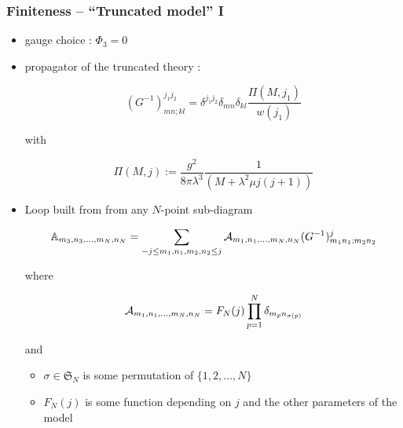 \documentclass[9pt]{beamer}
\begin{document}
\begin{frame}

\frametitle{Finiteness -- ``Truncated model'' I}

\begin{itemize}
\item gauge choice : $\Phi_3 = 0$

\item propagator of the truncated theory : 

\begin{equation*}
(G^{-1})^{j_1j_2}_{mn;kl}=\delta^{j_1j_2}\delta_{mn}\delta_{kl}\frac{\Pi(M,j_1)}{w(j_1)}
\end{equation*}

with

\vspace*{-5pt}
\begin{equation*}
\Pi(M,j) := \frac{g^2}{8\pi\lambda^3}\frac{1}{(M+\lambda^2\mu j(j+1))}
\end{equation*}

\item Loop built from from any $N$-point sub-diagram

\begin{equation*}
\mathbb{A}_{m_3,n_3,...,m_N,n_N}=\sum_{-j\le m_1,n_1,m_2,n_2\le j}{\cal{A}}_{m_1,n_1,...,m_N,n_N}(G^{-1})^j_{m_1n_1;m_2n_2}
\end{equation*}

where

\vspace*{-5pt}
\begin{equation*}
{\cal{A}}_{m_1,n_1,...,m_N,n_N}=F_N(j)\prod_{p=1}^N\delta_{m_pn_{\sigma(p)}}
\end{equation*}

and 

\begin{itemize}
\item $\sigma\in\mathfrak{S}_{N}$ is some permutation of $\{1,2,...,N \}$

\item $F_N(j)$ is some function depending on $j$ and the other parameters of the model
\end{itemize}

\end{itemize}

\end{frame}

\end{document}
